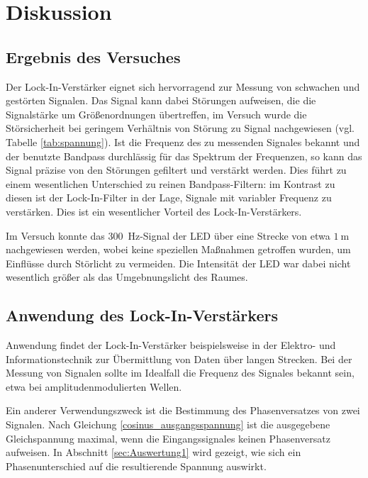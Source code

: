 \section{Diskussion}
\label{sec:Diskussion}

\subsection{Ergebnis des Versuches}
Der Lock-In-Verstärker eignet sich hervorragend zur Messung von schwachen und gestörten Signalen.
Das Signal kann dabei Störungen aufweisen, die die Signalstärke um Größenordnungen übertreffen, im Versuch wurde die Störsicherheit bei geringem Verhältnis von Störung zu Signal nachgewiesen (vgl. Tabelle \ref{tab:spannung}).
Ist die Frequenz des zu messenden Signales bekannt und der benutzte Bandpass durchlässig für das Spektrum der Frequenzen, so kann das Signal präzise von den Störungen gefiltert und verstärkt werden.
Dies führt zu einem wesentlichen Unterschied zu reinen Bandpass-Filtern:
im Kontrast zu diesen ist der Lock-In-Filter in der Lage, Signale mit variabler Frequenz zu verstärken. 
Dies ist ein wesentlicher Vorteil des Lock-In-Verstärkers.

Im Versuch konnte das \SI{300}{\hertz}-Signal der LED über eine Strecke von etwa $\SI{1}{\meter}$ nachgewiesen werden, wobei keine speziellen Maßnahmen getroffen wurden, um Einflüsse durch Störlicht zu vermeiden.
Die Intensität der LED war dabei nicht wesentlich größer als das Umgebnungslicht des Raumes.

\subsection{Anwendung des Lock-In-Verstärkers}
Anwendung findet der Lock-In-Verstärker beispielsweise in der Elektro- und Informationstechnik zur Übermittlung von Daten über langen Strecken.
Bei der Messung von Signalen sollte im Idealfall die Frequenz des Signales bekannt sein, etwa bei amplitudenmodulierten Wellen.

Ein anderer Verwendungszweck ist die Bestimmung des Phasenversatzes von zwei Signalen. 
Nach Gleichung \eqref{cosinus_ausgangsspannung} ist die ausgegebene Gleichspannung maximal, wenn die Eingangssignales keinen Phasenversatz aufweisen. 
In Abschnitt \ref{sec:Auswertung1} wird gezeigt, wie sich ein Phasenunterschied auf die resultierende Spannung auswirkt. 